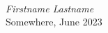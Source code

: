 
\lipsum[1-5] \\

\begin{flushright}
    \textit{Firstname Lastname} \\
    Somewhere, June 2023\\
\end{flushright}


